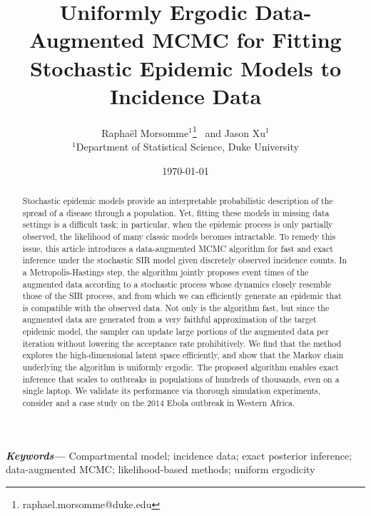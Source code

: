 \documentclass[11pt]{article}
\begin{document}
	
	\providecommand{\keywords}[1]
	{
		\small	
		\textbf{\textit{Keywords---}} #1
	}
	
	
	\title{%
		Uniformly Ergodic Data-Augmented MCMC for Fitting Stochastic Epidemic Models to Incidence Data}
	\author{Rapha\"{e}l Morsomme$^{1}$\footnote{raphael.morsomme@duke.edu} \ and Jason Xu$^{1}$ \\
		\small $^{1}$Department of Statistical Science, Duke University \\
	}
	\date{\today}	
	\maketitle
	
	\begin{abstract}
		Stochastic epidemic models provide an interpretable probabilistic description of the spread of a disease through a population. Yet, fitting these models in missing data settings is a difficult task; in particular, when the epidemic process is only partially observed, the likelihood of many classic models becomes intractable. To remedy this issue, this article introduces a data-augmented MCMC algorithm for fast and exact inference under the stochastic SIR model given discretely observed incidence counts. In a Metropolis-Hastings step, the algorithm jointly proposes event times of the augmented data according to a stochastic process whose dynamics closely resemble those of the SIR process, and from which we can efficiently generate an epidemic that is compatible with the observed data. Not only is the algorithm fast, but since the augmented data are generated from a very faithful approximation of the target epidemic model, the sampler can update large portions of the augmented data per iteration without lowering the acceptance rate prohibitively. We find that the method explores the high-dimensional latent space efficiently, and show that the Markov chain underlying the algorithm is uniformly ergodic. %
		The proposed algorithm enables exact inference that scales to outbreaks in populations of hundreds of thousands, even on a single laptop. We validate its performance via thorough simulation experiments, consider and a case study on the $2014$ Ebola outbreak in Western Africa. %
	\end{abstract}
	\keywords{Compartmental model; incidence data; exact posterior inference; data-augmented MCMC; likelihood-based methods; uniform ergodicity}
	
\end{document}
